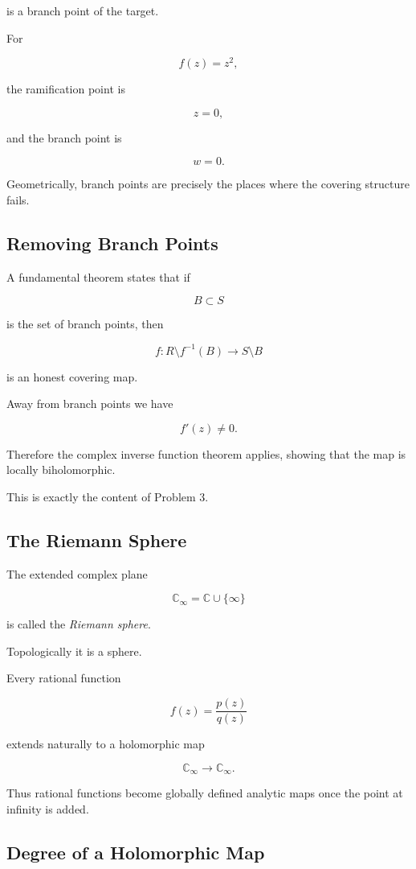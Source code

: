 \documentclass[12pt,a4paper]{article}
\theoremstyle{notespace}
\begin{document}
is a branch point of the target.

For

\[
f(z)=z^2,
\]

the ramification point is

\[
z=0,
\]

and the branch point is

\[
w=0.
\]

Geometrically, branch points are precisely the places where the covering structure fails.

\subsection{Removing Branch Points}

A fundamental theorem states that if

\[
B\subset S
\]

is the set of branch points, then

\[
f:R\setminus f^{-1}(B)\to S\setminus B
\]

is an honest covering map.

Away from branch points we have

\[
f'(z)\neq0.
\]

Therefore the complex inverse function theorem applies, showing that the map is locally biholomorphic.

This is exactly the content of Problem 3.

\subsection{The Riemann Sphere}

The extended complex plane

\[
\mathbb C_\infty
=
\mathbb C\cup\{\infty\}
\]

is called the \emph{Riemann sphere}.

Topologically it is a sphere.

Every rational function

\[
f(z)=\frac{p(z)}{q(z)}
\]

extends naturally to a holomorphic map

\[
\mathbb C_\infty\to\mathbb C_\infty.
\]

Thus rational functions become globally defined analytic maps once the point at infinity is added.

\subsection{Degree of a Holomorphic Map}
\end{document}
